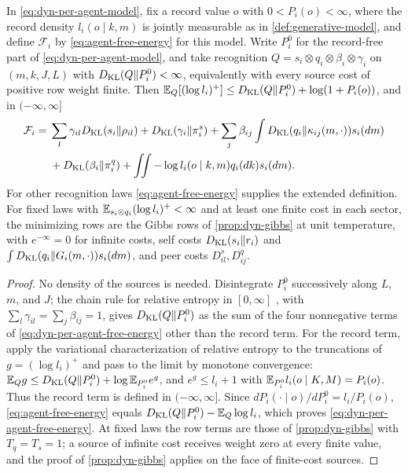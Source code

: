 In \cref{eq:dyn-per-agent-model}, fix a record value $o$ with $0<P_i(o)<\infty$, where the record density $l_i(o\mid k,m)$ is jointly measurable as in \cref{def:generative-model}, and define $\mathcal F_i$ by \cref{eq:agent-free-energy} for this model. Write $P_i^0$ for the record-free part of \cref{eq:dyn-per-agent-model}, and take recognition $Q=s_i\otimes q_i\otimes\beta_i\otimes\gamma_i$ on $(m,k,J,L)$ with $D_{\mathrm{KL}}(Q\Vert P_i^0)<\infty$, equivalently with every source cost of positive row weight finite. Then $\mathbb E_Q[(\log l_i)^+]\leq D_{\mathrm{KL}}(Q\Vert P_i^0)+\log(1+P_i(o))$, and in $(-\infty,\infty]$
\begin{equation}
 \begin{aligned}
 \mathcal F_i={}&\sum_l\gamma_{il}D_{\mathrm{KL}}(s_i\Vert\rho_{il})+D_{\mathrm{KL}}(\gamma_i\Vert\pi_i^s)
 +\sum_j\beta_{ij}\int D_{\mathrm{KL}}(q_i\Vert\kappa_{ij}(m,\cdot))s_i(dm)\\
 &+D_{\mathrm{KL}}(\beta_i\Vert\pi_i^q)
 +\iint-\log l_i(o\mid k,m)q_i(dk)s_i(dm).
 \end{aligned}
 \label{eq:dyn-per-agent-free-energy}
\end{equation}
For other recognition laws \cref{eq:agent-free-energy} supplies the extended definition. For fixed laws with $\mathbb E_{s_i\otimes q_i}(\log l_i)^+<\infty$ and at least one finite cost in each sector, the minimizing rows are the Gibbs rows of \cref{prop:dyn-gibbs} at unit temperature, with $e^{-\infty}=0$ for infinite costs, self costs $D_{\mathrm{KL}}(s_i\Vert r_i)$ and $\int D_{\mathrm{KL}}(q_i\Vert G_i(m,\cdot))s_i(dm)$, and peer costs $D^s_{il},D^q_{ij}$.
\begin{proof}
No density of the sources is needed. Disintegrate $P_i^0$ successively along $L$, $m$, and $J$; the chain rule for relative entropy in $[0,\infty]$ \citep{Gray1990}, with $\sum_l\gamma_{il}=\sum_j\beta_{ij}=1$, gives $D_{\mathrm{KL}}(Q\Vert P_i^0)$ as the sum of the four nonnegative terms of \cref{eq:dyn-per-agent-free-energy} other than the record term. For the record term, apply the variational characterization of relative entropy \citep{DonskerVaradhan1975} to the truncations of $g=(\log l_i)^+$ and pass to the limit by monotone convergence: $\mathbb E_Qg\leq D_{\mathrm{KL}}(Q\Vert P_i^0)+\log\mathbb E_{P_i^0}e^g$, and $e^g\leq l_i+1$ with $\mathbb E_{P_i^0}l_i(o\mid K,M)=P_i(o)$. Thus the record term is defined in $(-\infty,\infty]$. Since $dP_i(\cdot\mid o)/dP_i^0=l_i/P_i(o)$, \cref{eq:agent-free-energy} equals $D_{\mathrm{KL}}(Q\Vert P_i^0)-\mathbb E_Q\log l_i$, which proves \cref{eq:dyn-per-agent-free-energy}. At fixed laws the row terms are those of \cref{prop:dyn-gibbs} with $T_q=T_s=1$; a source of infinite cost receives weight zero at every finite value, and the proof of \cref{prop:dyn-gibbs} applies on the face of finite-cost sources.
\end{proof}

